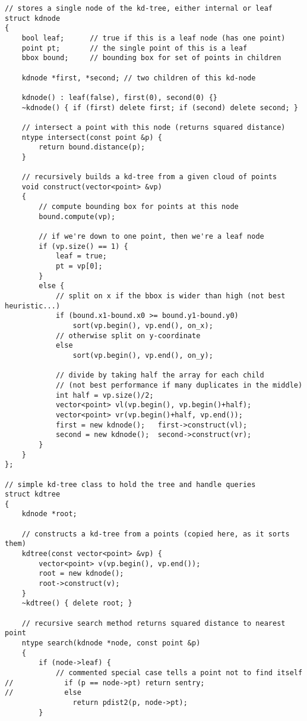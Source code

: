 \documentclass[11pt, oneside]{article}
\begin{document}
\begin{lstlisting}
// stores a single node of the kd-tree, either internal or leaf
struct kdnode 
{
    bool leaf;      // true if this is a leaf node (has one point)
    point pt;       // the single point of this is a leaf
    bbox bound;     // bounding box for set of points in children
    
    kdnode *first, *second; // two children of this kd-node
    
    kdnode() : leaf(false), first(0), second(0) {}
    ~kdnode() { if (first) delete first; if (second) delete second; }
    
    // intersect a point with this node (returns squared distance)
    ntype intersect(const point &p) {
        return bound.distance(p);
    }
    
    // recursively builds a kd-tree from a given cloud of points
    void construct(vector<point> &vp)
    {
        // compute bounding box for points at this node
        bound.compute(vp);
        
        // if we're down to one point, then we're a leaf node
        if (vp.size() == 1) {
            leaf = true;
            pt = vp[0];
        }
        else {
            // split on x if the bbox is wider than high (not best heuristic...)
            if (bound.x1-bound.x0 >= bound.y1-bound.y0)
                sort(vp.begin(), vp.end(), on_x);
            // otherwise split on y-coordinate
            else
                sort(vp.begin(), vp.end(), on_y);
            
            // divide by taking half the array for each child
            // (not best performance if many duplicates in the middle)
            int half = vp.size()/2;
            vector<point> vl(vp.begin(), vp.begin()+half);
            vector<point> vr(vp.begin()+half, vp.end());
            first = new kdnode();   first->construct(vl);
            second = new kdnode();  second->construct(vr);            
        }
    }
};

// simple kd-tree class to hold the tree and handle queries
struct kdtree
{
    kdnode *root;
    
    // constructs a kd-tree from a points (copied here, as it sorts them)
    kdtree(const vector<point> &vp) {
        vector<point> v(vp.begin(), vp.end());
        root = new kdnode();
        root->construct(v);
    }
    ~kdtree() { delete root; }
    
    // recursive search method returns squared distance to nearest point
    ntype search(kdnode *node, const point &p)
    {
        if (node->leaf) {
            // commented special case tells a point not to find itself
//            if (p == node->pt) return sentry;
//            else               
                return pdist2(p, node->pt);
        }
        

\end{lstlisting}
\end{document}
